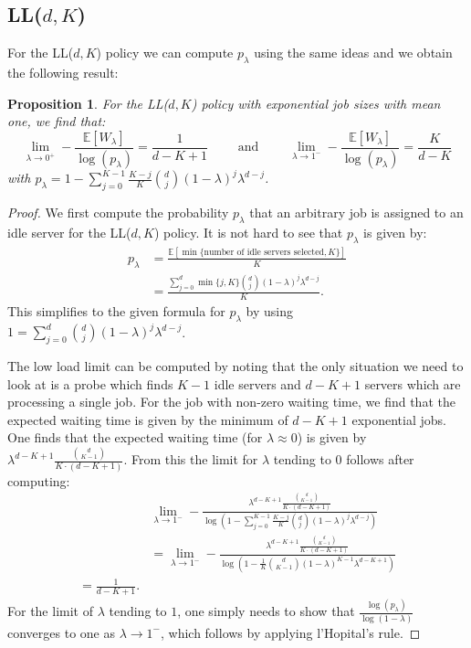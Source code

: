\documentclass[12pt]{report}
\newcommand{\E}{\mathbb{E}}
\newtheorem{proposition}[theorem]{Proposition}
\begin{document}
\subsection{LL($d, K$)}
For the LL($d,K$) policy we can compute $p_\lambda$ using the same ideas and we obtain the following result:
\begin{proposition} \label{prop:LLdK_lb}
For the LL($d, K$) policy with exponential job sizes with mean one, we find that:
\begin{equation}
\lim_{\lambda \rightarrow 0^+} - \frac{\E[W_\lambda]}{\log(p_\lambda)} = \frac{1}{d-K+1} \qquad \mbox{ and } \qquad \lim_{\lambda \rightarrow 1^-} - \frac{\E[W_\lambda]}{\log(p_\lambda)} = \frac{K}{d-K} 
\end{equation}
with $p_\lambda = 1 - \sum_{j=0}^{K-1} \frac{K-j}{K} \binom{d}{j}(1-\lambda)^j \lambda^{d-j}$.
\end{proposition}
\begin{proof}
We first compute the probability $p_\lambda$ that an arbitrary job is assigned to an idle server for the LL($d, K$) policy. It is not hard to see that $p_\lambda$ is given by:
\begin{align*}
p_\lambda & = \frac{\E[\min\{\mbox{number of idle servers selected}, K\}]}{K}\\
& = \frac{\sum_{j=0}^d \min\{j, K\} \binom{d}{j} (1-\lambda)^j \lambda^{d-j}}{K}.
\end{align*}
This simplifies to the given formula for $p_\lambda$ by using $1 = \sum_{j=0}^d \binom{d}{j} (1-\lambda)^j \lambda^{d-j}$.

The low load limit can be computed by noting that the only situation we need to look at is a probe which finds $K-1$ idle servers and $d-K+1$ servers which are processing a single job. For the job with non-zero waiting time, we find that the expected waiting time is given by the minimum of $d-K+1$ exponential jobs. One finds that the expected waiting time (for $\lambda \approx 0$) is given by $\lambda^{d-K+1} \frac{\binom{d}{K-1}}{K\cdot (d-K+1)}$. From this the limit for $\lambda$ tending to $0$ follows after computing:
\begin{align*}
&\lim_{\lambda \rightarrow 1^-} - \frac{\lambda^{d-K+1} \frac{\binom{d}{K-1}}{K\cdot (d-K+1)}}{\log\left( 1 - \sum_{j=0}^{K-1} \frac{K-j}{K} \binom{d}{j} (1-\lambda)^j \lambda^{d-j} \right)}\\
&=
\lim_{\lambda \rightarrow 1^-} - \frac{\lambda^{d-K+1} \frac{\binom{d}{K-1}}{K\cdot (d-K+1)}}{\log\left( 1 - \frac{1}{K} \binom{d}{K-1} (1-\lambda)^{K-1} \lambda^{d-K+1} \right)}\\
= \frac{1}{d-K+1}.
\end{align*}
For the limit of $\lambda$ tending to $1$, one simply needs to show that $\frac{\log(p_\lambda)}{\log(1-\lambda)}$ converges to one as $\lambda \rightarrow 1^-$, which follows by applying l'Hopital's rule.
\end{proof}
\end{document}
